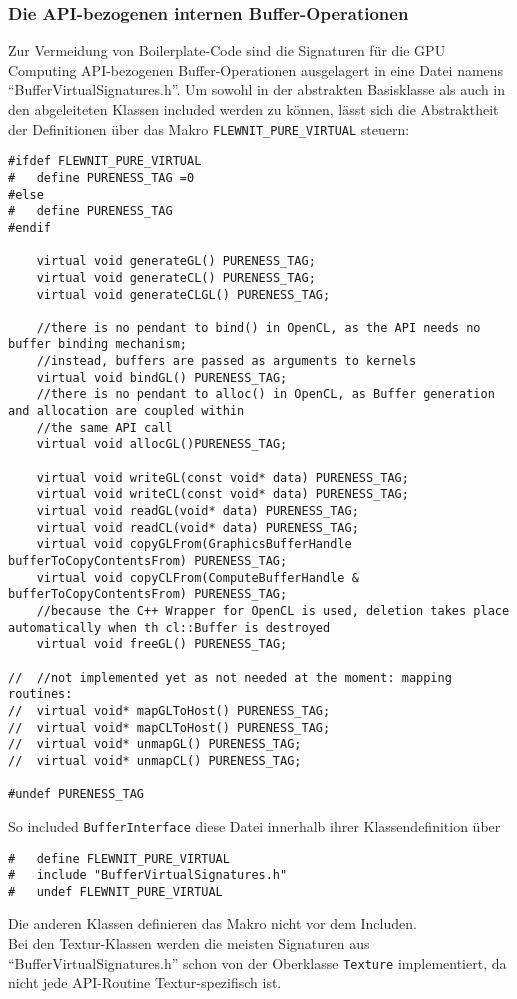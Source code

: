 	\subsubsection{Die API-bezogenen internen Buffer-Operationen}
	Zur Vermeidung von Boilerplate-Code sind die Signaturen für die GPU Computing API-bezogenen 
	Buffer-Operationen ausgelagert in eine Datei namens "`BufferVirtualSignatures.h"'.
	Um sowohl in der abstrakten Basisklasse als auch in den abgeleiteten Klassen included werden zu können,
	lässt sich die Abstraktheit der Definitionen über das Makro \lstinline|FLEWNIT_PURE_VIRTUAL| steuern:
		
	\begin{lstlisting}[caption={API- und Buffertyp-abhängige Operationen auf Buffern -- Definitionen},
					   label=listing:bufferOpDefs]	
#ifdef FLEWNIT_PURE_VIRTUAL
#	define PURENESS_TAG =0
#else
#	define PURENESS_TAG
#endif

	virtual void generateGL() PURENESS_TAG;
	virtual void generateCL() PURENESS_TAG;
	virtual void generateCLGL() PURENESS_TAG;

	//there is no pendant to bind() in OpenCL, as the API needs no buffer binding mechanism;
	//instead, buffers are passed as arguments to kernels
	virtual void bindGL() PURENESS_TAG;
	//there is no pendant to alloc() in OpenCL, as Buffer generation and allocation are coupled within
	//the same API call
	virtual void allocGL()PURENESS_TAG;

	virtual void writeGL(const void* data) PURENESS_TAG;
	virtual void writeCL(const void* data) PURENESS_TAG;
	virtual void readGL(void* data)	PURENESS_TAG;
	virtual void readCL(void* data)	PURENESS_TAG;
	virtual void copyGLFrom(GraphicsBufferHandle bufferToCopyContentsFrom) PURENESS_TAG;
	virtual void copyCLFrom(ComputeBufferHandle & bufferToCopyContentsFrom) PURENESS_TAG;
	//because the C++ Wrapper for OpenCL is used, deletion takes place automatically when th cl::Buffer is destroyed
	virtual void freeGL() PURENESS_TAG;
	
//	//not implemented yet as not needed at the moment: mapping routines:
//	virtual void* mapGLToHost() PURENESS_TAG;
//	virtual void* mapCLToHost() PURENESS_TAG;
//	virtual void* unmapGL() PURENESS_TAG;
//	virtual void* unmapCL() PURENESS_TAG;

#undef PURENESS_TAG
	\end{lstlisting}
	
	So included \lstinline|BufferInterface| diese Datei innerhalb ihrer Klassendefinition über
	\begin{lstlisting}
#	define FLEWNIT_PURE_VIRTUAL
#	include "BufferVirtualSignatures.h"
#	undef FLEWNIT_PURE_VIRTUAL
	\end{lstlisting}
	Die anderen Klassen definieren das Makro nicht vor dem Includen.\\
	Bei den Textur-Klassen werden die meisten Signaturen aus "`BufferVirtualSignatures.h"'
	schon von der Oberklasse \lstinline|Texture| implementiert, da nicht jede API-Routine Textur-spezifisch ist.\\

